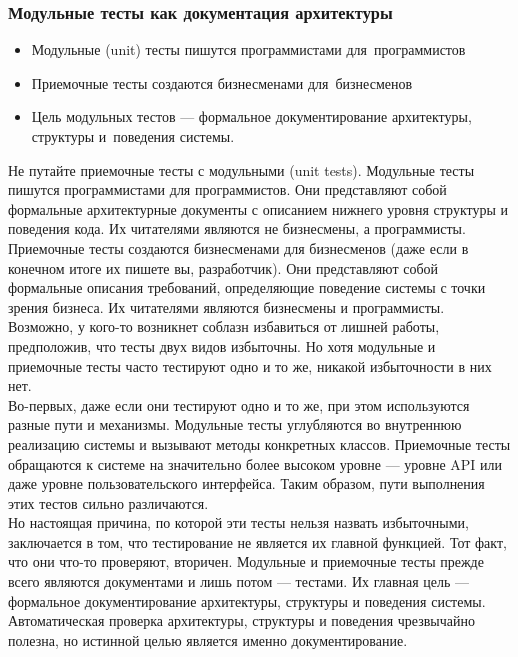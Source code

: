 \documentclass{../industrial-development}
\begin{document}
\begin{frame} \frametitle{Модульные тесты как документация архитектуры}
\begin{itemize}
  \item Модульные (unit) тесты пишутся программистами для~программистов
  \item Приемочные тесты создаются бизнесменами для~бизнесменов
	\item Цель модульных тестов --- формальное документирование архитектуры, структуры и~поведения системы.
\end{itemize}
\end{frame}
\lecturenotes
Не путайте приемочные тесты с модульными (unit tests). Модульные тесты пишутся программистами для программистов. Они представляют собой формальные архитектурные документы с описанием нижнего уровня структуры и поведения кода. Их читателями являются не бизнесмены, а программисты.\\
Приемочные тесты создаются бизнесменами для бизнесменов (даже если в конечном итоге их пишете вы, разработчик). Они представляют собой формальные описания требований, определяющие поведение системы с точки зрения бизнеса. Их читателями являются бизнесмены и программисты.\\
Возможно, у кого-то возникнет соблазн избавиться от лишней работы, предположив, что тесты двух видов избыточны. Но хотя модульные и приемочные тесты часто тестируют одно и то же, никакой избыточности в них нет.\\
Во-первых, даже если они тестируют одно и то же, при этом используются разные пути и механизмы. Модульные тесты углубляются во внутреннюю реализацию системы и вызывают методы конкретных классов. Приемочные тесты обращаются к системе на значительно более высоком уровне — уровне API или даже уровне пользовательского
интерфейса. Таким образом, пути выполнения этих тестов сильно различаются.\\
Но настоящая причина, по которой эти тесты нельзя назвать избыточными, заключается в том, что тестирование не является их главной функцией. Тот факт, что они что-то проверяют, вторичен. Модульные и приемочные тесты прежде всего являются документами и лишь потом — тестами. Их главная цель — формальное документирование архитектуры, структуры и поведения системы. Автоматическая проверка архитектуры, структуры и поведения чрезвычайно полезна, но истинной целью является именно документирование.
\end{document}
